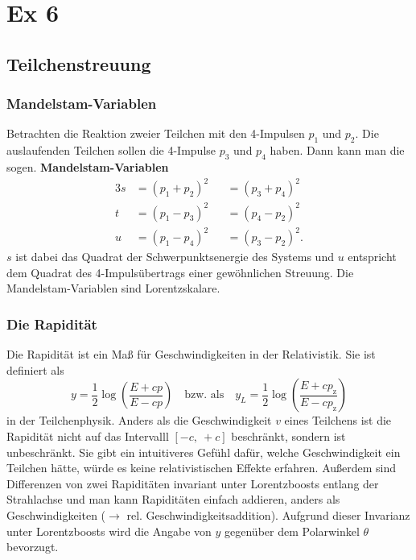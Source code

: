 \chapter{Ex 6}

\section{Teilchenstreuung}

\subsection{Mandelstam-Variablen}
Betrachten die Reaktion zweier Teilchen mit den 4-Impulsen $p_1$ und $p_2$. Die auslaufenden Teilchen sollen die 4-Impulse $p_3$ und $p_4$ haben.
Dann kann man die sogen. \textbf{Mandelstam-Variablen}
\begin{alignat*}{3}
	s &= \left(p_1 + p_2 \right)^2 &&= \left(p_3 + p_4 \right)^2 \\
	t &= \left(p_1 - p_3 \right)^2 &&= \left(p_4 - p_2 \right)^2 \\
	u &= \left(p_1 - p_4 \right)^2 &&= \left(p_3 - p_2 \right)^2.
\end{alignat*}
$s$ ist dabei das Quadrat der Schwerpunktsenergie des Systems und $u$ entspricht dem Quadrat des 4-Impulsübertrags einer gewöhnlichen Streuung.
Die Mandelstam-Variablen sind Lorentzskalare.

\subsection{Die Rapidität}
Die Rapidität ist ein Maß für Geschwindigkeiten in der Relativistik.
Sie ist definiert als
\begin{equation*}
	y = \frac{1}{2}\log\left(\frac{E+cp}{E-cp}\right)\quad \text{bzw. als}\quad y_L=\frac{1}{2}\log\left(\frac{E+cp_\text{z}}{E-cp_\text{z}}\right)
\end{equation*}
in der Teilchenphysik.
Anders als die Geschwindigkeit $v$ eines Teilchens ist die Rapidität nicht auf das Intervalll $[-c,\ +c]$ beschränkt, sondern ist unbeschränkt.
Sie gibt ein intuitiveres Gefühl dafür, welche Geschwindigkeit ein Teilchen hätte, würde es keine relativistischen Effekte erfahren.
Außerdem sind Differenzen von zwei Rapiditäten invariant unter Lorentzboosts entlang der Strahlachse und man kann Rapiditäten einfach addieren, anders als Geschwindigkeiten ($\rightarrow$ rel. Geschwindigkeitsaddition).
Aufgrund dieser Invarianz unter Lorentzboosts wird die Angabe von $y$ gegenüber dem Polarwinkel $\theta$ bevorzugt.

